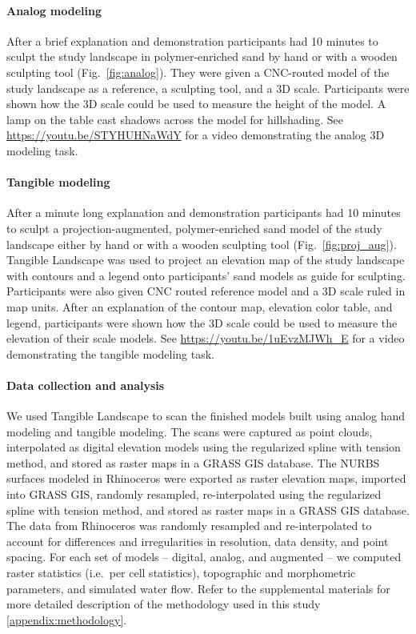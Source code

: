\documentclass[Afour,sagev,times]{sagej} %
\begin{document}
\paragraph{Analog modeling}
After a brief explanation and demonstration
participants had 10 minutes to sculpt 
the study landscape in polymer-enriched sand 
by hand or with a wooden sculpting tool (Fig.~\ref{fig:analog}).  
They were given a CNC-routed model of the study landscape 
as a reference, a sculpting tool, and a 3D scale. 
Participants were shown how the 3D scale could be used to 
measure the height of the model. 
A lamp on the table cast shadows across the model for hillshading.
See \url{https://youtu.be/STYHUHNaWdY}
for a video demonstrating the analog 3D modeling task.

\paragraph{Tangible modeling}
After a minute long explanation and demonstration
participants had 10 minutes to sculpt
a projection-augmented, polymer-enriched sand model
of the study landscape 
either by hand or with a wooden sculpting tool 
(Fig.~\ref{fig:proj_aug}). 
Tangible Landscape was used to project 
an elevation map of the study landscape
with contours and a legend
onto participants' sand models as guide for sculpting. 
Participants were also given CNC routed reference model and 
a 3D scale ruled in map units. 
After an explanation of the contour map, elevation color table, and legend,
participants were shown how the 3D scale could be used to 
measure the elevation of their scale models.
See \url{https://youtu.be/1uEvzMJWh_E}
for a video demonstrating the tangible modeling task.

\paragraph{Data collection and analysis}
We used Tangible Landscape to scan the finished models 
built using analog hand modeling and tangible modeling.
The scans were captured as point clouds, interpolated 
as digital elevation models 
using the regularized spline with tension method,
and stored as raster maps in a GRASS GIS database. 
The NURBS surfaces modeled in Rhinoceros 
were exported as raster elevation maps,
imported into GRASS GIS, randomly resampled, 
re-interpolated using the regularized spline with tension method, 
and stored as raster maps in a GRASS GIS database. 
The data from Rhinoceros 
was randomly resampled and re-interpolated to account for 
differences and irregularities in resolution, data density, and point spacing.
For each set of models -- digital, analog, and augmented --
we computed raster statistics (i.e.~per cell statistics), 
topographic and morphometric parameters, 
and simulated water flow.
%
Refer to the supplemental materials 
for more detailed description of the methodology
used in this study
\ref{appendix:methodology}.
\end{document}
